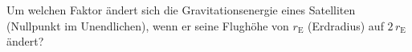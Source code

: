 Um welchen Faktor ändert sich die Gravitationsenergie eines Satelliten (Nullpunkt im Unendlichen), wenn er seine Flughöhe von $r_\mathrm{E}$ (Erdradius) auf $2\,r_\mathrm{E}$ ändert?

